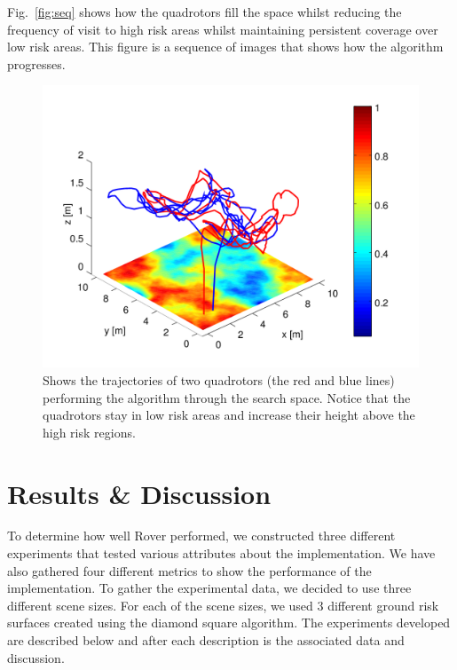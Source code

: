 \documentclass{article}
\begin{document}
Fig.~\ref{fig:seq} shows how the quadrotors fill the space whilst reducing the
frequency of visit to high risk areas whilst maintaining persistent coverage
over low risk areas. This figure is a sequence of images that shows how the
algorithm progresses.

\begin{figure}[ht]

    \centering
    \includegraphics[width=1\linewidth]{tasefigs/trajsim.png}

    \caption{Shows the trajectories of two quadrotors (the red and blue lines)
    performing the algorithm through the search space. Notice that the
    quadrotors stay in low risk areas and increase their height above the
    high risk regions.}

    \label{fig:trajsim}

\end{figure}

\section{Results \& Discussion}

To determine how well Rover performed, we constructed three different
experiments that tested various attributes about the implementation. We have
also gathered four different metrics to show the performance of the
implementation. To gather the experimental data, we decided to use three
different scene sizes. For each of the scene sizes, we used 3 different ground
risk surfaces created using the diamond square algorithm. The experiments
developed are described below and after each description is the associated data
and discussion.
\end{document}
